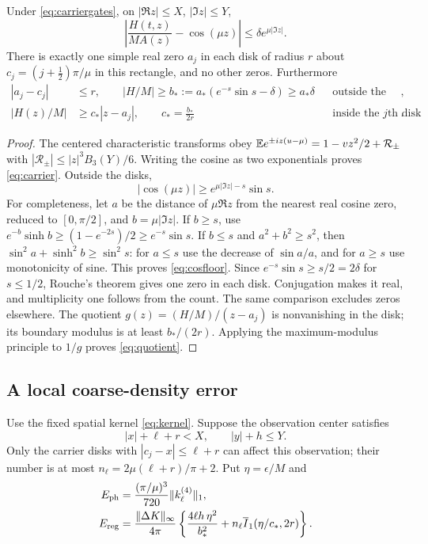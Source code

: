 \begin{lemma}\label{lem:carrier}
Under \eqref{eq:carriergates}, on $|\Re z|\le X$, $|\Im z|\le Y$,
\begin{equation}
 \left|\frac{H(t,z)}{MA(z)}-\cos(\mu z)\right|
       \le\delta e^{\mu|\Im z|}.
 \label{eq:carrier}
\end{equation}
There is exactly one simple real zero $a_j$ in each disk of radius $r$
about $c_j=(j+\tfrac12)\pi/\mu$ in this rectangle, and no other zeros.
Furthermore
\begin{align}
 |a_j-c_j|&\le r,\qquad
 |H/M|\ge b_*:=a_*(e^{-s}\sin s-\delta)\ge a_*\delta
              &&\text{outside the disks},\label{eq:floor}\\
 |H(z)/M|&\ge c_*|z-a_j|,\qquad c_*=\frac{b_*}{2r}
              &&\text{inside the $j$th disk}.\label{eq:quotient}
\end{align}
\end{lemma}
\begin{proof}
The centered characteristic transforms obey
$\mathbb E e^{\pm iz(u-\mu)}=1-vz^2/2+\mathcal R_\pm$ with
$|\mathcal R_\pm|\le |z|^3B_3(Y)/6$.
Writing the cosine as two exponentials proves \eqref{eq:carrier}.
Outside the disks,
\begin{equation}
 |\cos(\mu z)|\ge e^{\mu|\Im z|-s}\sin s .
 \label{eq:cosfloor}
\end{equation}
For completeness, let $a$ be the distance of $\mu\Re z$ from the
nearest real cosine zero, reduced to $[0,\pi/2]$, and
$b=\mu|\Im z|$. If $b\ge s$, use
$e^{-b}\sinh b\ge(1-e^{-2s})/2\ge e^{-s}\sin s$.
If $b\le s$ and $a^2+b^2\ge s^2$, then
$\sin^2a+\sinh^2b\ge\sin^2s$: for $a\le s$ use the decrease
of $\sin a/a$, and for $a\ge s$ use monotonicity of sine.
This proves \eqref{eq:cosfloor}.
Since $e^{-s}\sin s\ge s/2=2\delta$ for $s\le1/2$,
Rouche's theorem \cite{DLMF110Coarse2026} gives one zero in each disk.
Conjugation makes it real, and multiplicity one follows from the count.
The same comparison excludes zeros elsewhere.
The quotient $g(z)=(H/M)/(z-a_j)$ is nonvanishing in the disk;
its boundary modulus is at least $b_*/(2r)$.
Applying the maximum-modulus principle to $1/g$ proves
\eqref{eq:quotient}.
\end{proof}

\subsection{A local coarse-density error}
Use the fixed spatial kernel \eqref{eq:kernel}.
Suppose the observation center satisfies
\begin{equation}
 |x|+\ell+r<X,\qquad |y|+h\le Y .
 \label{eq:buffer}
\end{equation}
Only the carrier disks with $|c_j-x|\le\ell+r$ can affect this
observation; their number is at most
$n_\ell=2\mu(\ell+r)/\pi+2$.
Put $\eta=\epsilon/M$ and
\begin{align}
 E_{\rm ph}&=\frac{(\pi/\mu)^3}{720}\|k_\ell^{(4)}\|_1,\label{eq:Ephase}\\
 E_{\rm reg}&=\frac{\|\Delta K\|_\infty}{4\pi}
 \left\{\frac{4\ell h\,\eta^2}{b_*^2}
              +n_\ell\overline I_1(\eta/c_*,2r)\right\}.\label{eq:Ereg}
\end{align}

